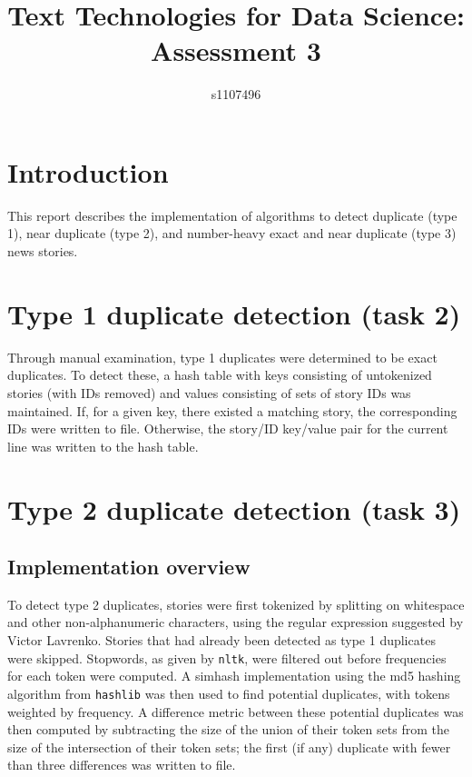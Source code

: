 \documentclass{article}
\begin{document}
\title{Text Technologies for Data Science: Assessment 3}
\author{s1107496}

\maketitle

\section{Introduction}
This report describes the implementation of algorithms to detect duplicate (type 1), near duplicate (type 2), and number-heavy exact and near duplicate (type 3) news stories.

\section{Type 1 duplicate detection (task 2)}
Through manual examination, type 1 duplicates were determined to be exact duplicates. To detect these, a hash table with keys consisting of untokenized stories (with IDs removed) and values consisting of sets of story IDs was maintained. If, for a given key, there existed a matching story, the corresponding IDs were written to file. Otherwise, the story/ID key/value pair for the current line was written to the hash table.

\section{Type 2 duplicate detection (task 3)}
\subsection{Implementation overview}
To detect type 2 duplicates, stories were first tokenized by splitting on whitespace and other non-alphanumeric characters, using the regular expression suggested by Victor Lavrenko. Stories that had already been detected as type 1 duplicates were skipped. Stopwords, as given by \texttt{nltk}, were filtered out before frequencies for each token were computed. A simhash implementation using the md5 hashing algorithm from \texttt{hashlib} was then used to find potential duplicates, with tokens weighted by frequency. A difference metric between these potential duplicates was then computed by subtracting the size of the union of their token sets from the size of the intersection of their token sets; the first (if any) duplicate with fewer than three differences was written to file.
\end{document}
